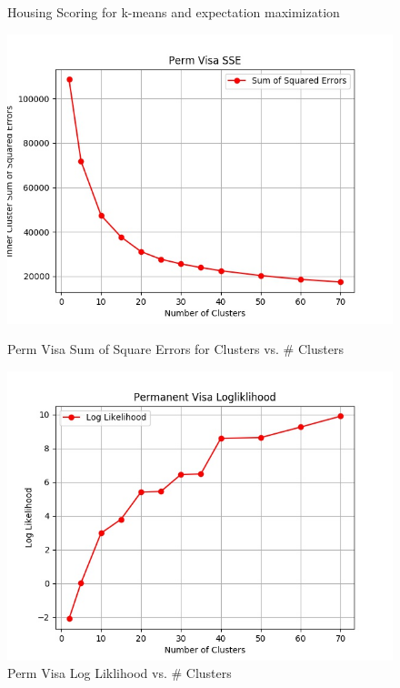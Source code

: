 \documentclass[h]{article}
\begin{document}
\begin{figure}[H]
      \caption*{Housing Scoring for k-means and expectation maximization} 
   \endminipage\hfill
\end{figure}
\begin{figure}[H]
      \includegraphics[width=1\textwidth,keepaspectratio]{perm_visa_sse.jpg} 
      \caption*{Perm Visa Sum of Square Errors for Clusters vs. \# Clusters} 
   \endminipage\hfill
      \includegraphics[width=1\textwidth,keepaspectratio]{permanent_visa_logliklihood.jpg} 
      \caption*{Perm Visa Log Liklihood vs. \# Clusters} 
   \endminipage\hfill

\end{figure}
\end{document}
